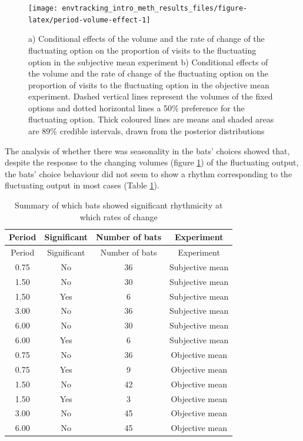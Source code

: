 \documentclass[
]{article}
\begin{document}
\begin{figure}[H]

{\centering \texttt{[image: envtracking\_intro\_meth\_results\_files/figure-latex/period-volume-effect-1]} 

}

\caption{a) Conditional effects of the volume and the rate of change of the fluctuating option on the proportion of visits to the fluctuating option in the subjective mean experiment b) Conditional effects of the volume and the rate of change of the fluctuating option on the proportion of visits to the fluctuating option in the objective mean experiment. Dashed vertical lines represent the volumes of the fixed options and dotted horizontal lines a 50\% preference for the fluctuating option. Thick coloured lines are means and shaded areas are 89\% credible intervals, drawn from the posterior distributions}\label{fig:period-volume-effect}
\end{figure}

The analysis of whether there was seasonality in the bats' choices showed that, despite the response to the changing volumes (figure \ref{fig:period-volume-effect}) of the fluctuating output, the bats' choice behaviour did not seem to show a rhythm corresponding to the fluctuating output in most cases (Table \ref{tab:rhythmicity}).

\begin{longtable}[]{@{}cccc@{}}
\caption{\label{tab:rhythmicity}Summary of which bats showed significant rhythmicity at which rates of change}\tabularnewline
\toprule
Period & Significant & Number of bats & Experiment \\
\midrule
\endfirsthead
\toprule
Period & Significant & Number of bats & Experiment \\
\midrule
\endhead
0.75 & No & 36 & Subjective mean \\
1.50 & No & 30 & Subjective mean \\
1.50 & Yes & 6 & Subjective mean \\
3.00 & No & 36 & Subjective mean \\
6.00 & No & 30 & Subjective mean \\
6.00 & Yes & 6 & Subjective mean \\
0.75 & No & 36 & Objective mean \\
0.75 & Yes & 9 & Objective mean \\
1.50 & No & 42 & Objective mean \\
1.50 & Yes & 3 & Objective mean \\
3.00 & No & 45 & Objective mean \\
6.00 & No & 45 & Objective mean \\
\bottomrule
\end{longtable}
\end{document}
